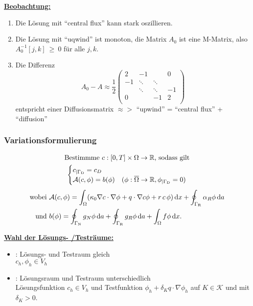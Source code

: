 \underline{\textbf{Beobachtung:}}
\begin{enumerate}
	\item Die Lösung mit \enquote{central flux} kann stark oszillieren.
	\item Die Lösung mit \enquote{uqwind} ist monoton, die Matrix $ A_0 $ ist eine M-Matrix, also $ A_0^{-1}[j,k]~\geq~0 $ für alle $ j,k $.
	\item Die Differenz
	\[ A_0 - A \approx \frac{1}{2}
	\begin{pmatrix} 
	2 & -1 & & 0\\
	-1& \ddots &\ddots & \\
	  & \ddots& \ddots & -1\\	
	0 & & -1 & 2\\		
	\end{pmatrix} \] 
	entspricht einer Diffusionsmatrix $ \approx> $ \enquote{upwind} = \enquote{central flux} + \enquote{diffusion}
\end{enumerate}

\subsubsection{Variationsformulierung}
\begin{gather*}
	\text{Bestimmme } c:[0,T] \times \Omega \to \mathbb{R} \text{, sodass gilt}\\
	\begin{cases}
		c_{|\Gamma_{\text{D}}} = c_D &\\
		\mathcal{A}(c,\phi) = b(\phi) &(\phi: \overline{\Omega} \to \mathbb{R}, \phi_{|\Gamma_{\text{D}}} = 0)
	\end{cases}
\end{gather*}
\begin{align*}
	\text{wobei } &\mathcal{A}(c,\phi) = \int_\Omega (\kappa_0 \nabla c \cdot \nabla \phi + q \cdot \nabla c \phi + r \, c \, \phi) \mathop{}\!\mathrm{d} x + \oint_{\Gamma_{\text{R}}} \alpha_R \phi \mathop{}\!\mathrm{d} a\\
	\text{und } &b(\phi) = \oint_{\Gamma_{\text{N}}} g_N \phi \mathop{}\!\mathrm{d} a + \oint_{\Gamma_{\text{R}}} g_R \phi \mathop{}\!\mathrm{d} a + \int_\Omega f \phi \mathop{}\!\mathrm{d} x.
\end{align*}

\underline{\textbf{Wahl der Lösungs- /Testräume:}}
\begin{itemize}
	\item {}: Lösungs- und Testraum gleich\\ $ c_h, \phi_h \in V_h$
	\item {}: Lösungsraum und Testraum unterschiedlich\\ Lösungsfunktion $ c_h \in V_h $ und Testfunktion $ \phi_h + \delta_K q \cdot \nabla \phi_h $ auf $ K \in \mathcal{K} $ und mit $ \delta_K > 0 $.
\end{itemize}

